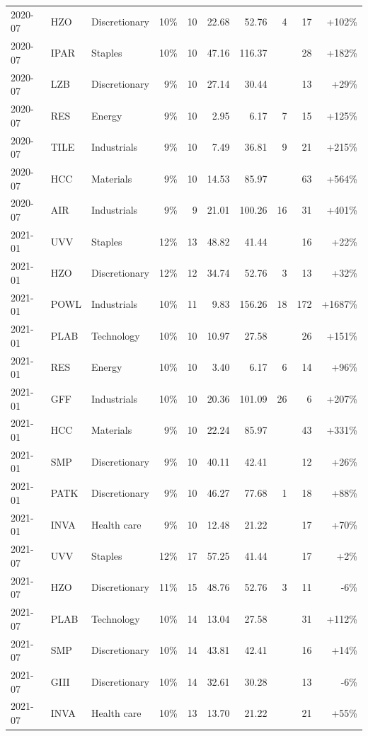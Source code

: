 \documentclass[11pt,a4paper]{article}
\begin{document}
{\begin{longtable}{l l l r r r r r r r}
2020-07 & HZO & Discretionary & 10\% & 10 & 22.68 & 52.76 & 4 & 17 & +102\% \\
2020-07 & IPAR & Staples & 10\% & 10 & 47.16 & 116.37 &  & 28 & +182\% \\
2020-07 & LZB & Discretionary & 9\% & 10 & 27.14 & 30.44 &  & 13 & +29\% \\
2020-07 & RES & Energy & 9\% & 10 & 2.95 & 6.17 & 7 & 15 & +125\% \\
2020-07 & TILE & Industrials & 9\% & 10 & 7.49 & 36.81 & 9 & 21 & +215\% \\
2020-07 & HCC & Materials & 9\% & 10 & 14.53 & 85.97 &  & 63 & +564\% \\
2020-07 & AIR & Industrials & 9\% & 9 & 21.01 & 100.26 & 16 & 31 & +401\% \\
2021-01 & UVV & Staples & 12\% & 13 & 48.82 & 41.44 &  & 16 & +22\% \\
2021-01 & HZO & Discretionary & 12\% & 12 & 34.74 & 52.76 & 3 & 13 & +32\% \\
2021-01 & POWL & Industrials & 10\% & 11 & 9.83 & 156.26 & 18 & 172 & +1687\% \\
2021-01 & PLAB & Technology & 10\% & 10 & 10.97 & 27.58 &  & 26 & +151\% \\
2021-01 & RES & Energy & 10\% & 10 & 3.40 & 6.17 & 6 & 14 & +96\% \\
2021-01 & GFF & Industrials & 10\% & 10 & 20.36 & 101.09 & 26 & 6 & +207\% \\
2021-01 & HCC & Materials & 9\% & 10 & 22.24 & 85.97 &  & 43 & +331\% \\
2021-01 & SMP & Discretionary & 9\% & 10 & 40.11 & 42.41 &  & 12 & +26\% \\
2021-01 & PATK & Discretionary & 9\% & 10 & 46.27 & 77.68 & 1 & 18 & +88\% \\
2021-01 & INVA & Health care & 9\% & 10 & 12.48 & 21.22 &  & 17 & +70\% \\
2021-07 & UVV & Staples & 12\% & 17 & 57.25 & 41.44 &  & 17 & +2\% \\
2021-07 & HZO & Discretionary & 11\% & 15 & 48.76 & 52.76 & 3 & 11 & -6\% \\
2021-07 & PLAB & Technology & 10\% & 14 & 13.04 & 27.58 &  & 31 & +112\% \\
2021-07 & SMP & Discretionary & 10\% & 14 & 43.81 & 42.41 &  & 16 & +14\% \\
2021-07 & GIII & Discretionary & 10\% & 14 & 32.61 & 30.28 &  & 13 & -6\% \\
2021-07 & INVA & Health care & 10\% & 13 & 13.70 & 21.22 &  & 21 & +55\% \\

\end{longtable}}
\end{document}
